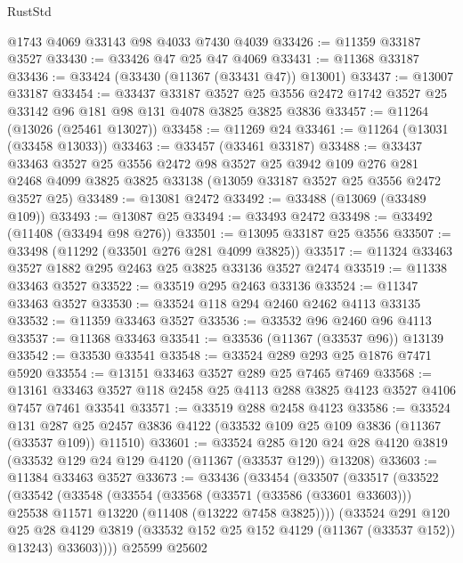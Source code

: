 \begin{lexlean}{RustStd}
\begin{coremodule}
    @1743
    @4069
    @33143
    @98
    @4033
    @7430
    @4039
@33426 := @11359 @33187 @3527
@33430 := @33426 @47 @25 @47 @4069
@33431 := @11368 @33187
@33436 := @33424 (@33430 (@11367 (@33431 @47)) @13001)
@33437 := @13007 @33187
@33454 := @33437
    @33187
    @3527
    @25
    @3556
    @2472
    @1742
    @3527
    @25
    @33142
    @96
    @181
    @98
    @131
    @4078
    @3825
    @3825
    @3836
@33457 := @11264 (@13026 (@25461 @13027))
@33458 := @11269 @24
@33461 := @11264 (@13031 (@33458 @13033))
@33463 := @33457 (@33461 @33187)
@33488 := @33437
    @33463
    @3527
    @25
    @3556
    @2472
    @98
    @3527
    @25
    @3942
    @109
    @276
    @281
    @2468
    @4099
    @3825
    @3825
    @33138
    (@13059 @33187 @3527 @25 @3556 @2472 @3527 @25)
@33489 := @13081 @2472
@33492 := @33488 (@13069 (@33489 @109))
@33493 := @13087 @25
@33494 := @33493 @2472
@33498 := @33492 (@11408 (@33494 @98 @276))
@33501 := @13095 @33187 @25 @3556
@33507 := @33498 (@11292 (@33501 @276 @281 @4099 @3825))
@33517 := @11324 @33463 @3527 @1882 @295 @2463 @25 @3825 @33136 @3527 @2474
@33519 := @11338 @33463 @3527
@33522 := @33519 @295 @2463 @33136
@33524 := @11347 @33463 @3527
@33530 := @33524 @118 @294 @2460 @2462 @4113 @33135
@33532 := @11359 @33463 @3527
@33536 := @33532 @96 @2460 @96 @4113
@33537 := @11368 @33463
@33541 := @33536 (@11367 (@33537 @96)) @13139
@33542 := @33530 @33541
@33548 := @33524 @289 @293 @25 @1876 @7471 @5920
@33554 := @13151 @33463 @3527 @289 @25 @7465 @7469
@33568 := @13161 @33463 @3527 @118 @2458 @25 @4113 @288 @3825 @4123 @3527 @4106 @7457 @7461 @33541
@33571 := @33519 @288 @2458 @4123
@33586 := @33524
    @131
    @287
    @25
    @2457
    @3836
    @4122
    (@33532 @109 @25 @109 @3836 (@11367 (@33537 @109)) @11510)
@33601 := @33524
    @285
    @120
    @24
    @28
    @4120
    @3819
    (@33532 @129 @24 @129 @4120 (@11367 (@33537 @129)) @13208)
@33603 := @11384 @33463 @3527
@33673 := @33436
    (@33454
      (@33507
        (@33517
          (@33522
            (@33542
              (@33548
                (@33554
                  (@33568
                    (@33571 (@33586 (@33601 @33603)))
                    @25538
                    @11571
                    @13220
                    (@11408 (@13222 @7458 @3825))))
                (@33524
                  @291
                  @120
                  @25
                  @28
                  @4129
                  @3819
                  (@33532 @152 @25 @152 @4129 (@11367 (@33537 @152)) @13243)
                  @33603))))
          @25599
          @25602

\end{coremodule}
\end{lexlean}
